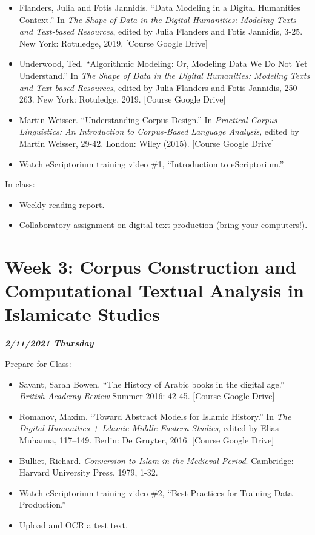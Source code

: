 \documentclass[
]{book}
\providecommand{\tightlist}{%
  \setlength{\itemsep}{0pt}\setlength{\parskip}{0pt}}
\begin{document}
\begin{itemize}
\tightlist
\item
  Flanders, Julia and Fotis Jannidis. ``Data Modeling in a Digital Humanities Context.'' In \emph{The Shape of Data in the Digital Humanities: Modeling Texts and Text-based Resources}, edited by Julia Flanders and Fotis Jannidis, 3-25. New York: Rotuledge, 2019. {[}Course Google Drive{]}\\
\item
  Underwood, Ted. ``Algorithmic Modeling: Or, Modeling Data We Do Not Yet Understand.'' In \emph{The Shape of Data in the Digital Humanities: Modeling Texts and Text-based Resources}, edited by Julia Flanders and Fotis Jannidis, 250-263. New York: Rotuledge, 2019. {[}Course Google Drive{]}
\item
  Martin Weisser. ``Understanding Corpus Design.'' In \emph{Practical Corpus Linguistics: An Introduction to Corpus‐Based Language Analysis}, edited by Martin Weisser, 29-42. London: Wiley (2015). {[}Course Google Drive{]}
\item
  Watch eScriptorium training video \#1, ``Introduction to eScriptorium.''
\end{itemize}

In class:

\begin{itemize}
\tightlist
\item
  Weekly reading report.
\item
  Collaboratory assignment on digital text production (bring your computers!).
\end{itemize}

\hypertarget{week-3-corpus-construction-and-computational-textual-analysis-in-islamicate-studies-1}{%
\chapter{Week 3: Corpus Construction and Computational Textual Analysis in Islamicate Studies}\label{week-3-corpus-construction-and-computational-textual-analysis-in-islamicate-studies-1}}

\textbf{\emph{2/11/2021 Thursday}}

Prepare for Class:

\begin{itemize}
\tightlist
\item
  Savant, Sarah Bowen. ``The History of Arabic books in the digital age.'' \emph{British Academy Review} Summer 2016: 42-45. {[}Course Google Drive{]}\\
\item
  Romanov, Maxim. ``Toward Abstract Models for Islamic History.'' In \emph{The Digital Humanities + Islamic Middle Eastern Studies}, edited by Elias Muhanna, 117--149. Berlin: De Gruyter, 2016. {[}Course Google Drive{]}
\item
  Bulliet, Richard. \emph{Conversion to Islam in the Medieval Period}. Cambridge: Harvard University Press, 1979, 1-32.
\item
  Watch eScriptorium training video \#2, ``Best Practices for Training Data Production.''
\item
  Upload and OCR a test text.
\end{itemize}
\end{document}
